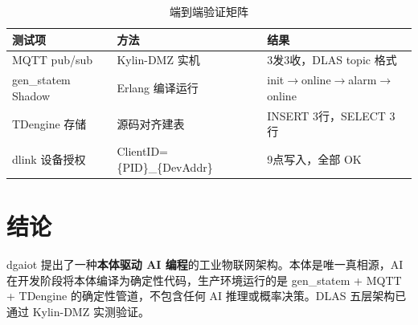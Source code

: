 \documentclass[12pt,a4paper]{ctexart}
\begin{document}
\begin{table}[H]\centering
\caption{端到端验证矩阵}
\begin{tabular}{p{4cm} p{3cm} p{5cm}}
\toprule
\textbf{测试项} & \textbf{方法} & \textbf{结果} \\
\midrule
MQTT pub/sub & Kylin-DMZ 实机 & 3发3收，DLAS topic 格式 \\
gen\_statem Shadow & Erlang 编译运行 & init$\rightarrow$online$\rightarrow$alarm$\rightarrow$online \\
TDengine 存储 & 源码对齐建表 & INSERT 3行，SELECT 3行 \\
dlink 设备授权 & ClientID=\{PID\}\_\{DevAddr\} & 9点写入，全部 OK \\
\bottomrule
\end{tabular}
\end{table}

\section{结论}

dgaiot 提出了一种\textbf{本体驱动 AI 编程}的工业物联网架构。本体是唯一真相源，AI 在开发阶段将本体编译为确定性代码，生产环境运行的是 gen\_statem + MQTT + TDengine 的确定性管道，不包含任何 AI 推理或概率决策。DLAS 五层架构已通过 Kylin-DMZ 实测验证。
\end{document}
